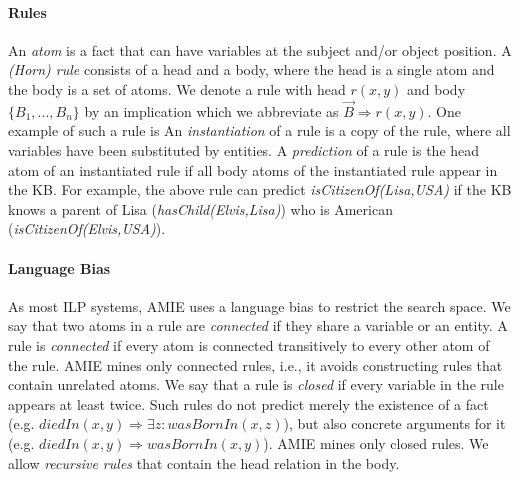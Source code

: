 \paragraph{Rules} An \emph{atom} is a fact that can have variables at the subject and/or object position. A \emph{(Horn) rule} consists of a head and a body, where the head is a single atom and the body is a set of atoms. We denote a rule with head $r(x,y)$ and body $\{B_1,..., B_n\}$ by an implication
which we abbreviate as $\vec{B} \Rightarrow r(x,y)$. One example of such a rule is
An \emph{instantiation} of a rule is a copy of the rule, where all variables have been substituted by entities. 
A \emph{prediction} of a rule is the head atom of an instantiated rule if all body atoms of the instantiated rule appear in the KB. 
For example, the above rule can predict \emph{isCitizenOf(Lisa,USA)} if the KB knows a parent of Lisa (\emph{hasChild(Elvis,Lisa)}) who is American (\emph{isCitizenOf(Elvis,USA)}).

\paragraph{Language Bias} As most ILP systems, AMIE uses a language bias to restrict the search space.
We say that two atoms in a rule are \emph{connected} if they share a variable or an entity.
A rule is \emph{connected} if every atom is connected transitively to every other atom of the rule. AMIE mines only connected rules, i.e., it avoids constructing rules that contain unrelated atoms.
We say that a rule is \emph{closed} if every variable in the rule appears at least twice. Such rules do not predict merely the existence of a fact (e.g. $diedIn(x,y)\Rightarrow \exists z:wasBornIn(x,z)$), 
but also concrete arguments for it (e.g. $diedIn(x,y)\Rightarrow wasBornIn(x,y)$). AMIE mines only closed rules. We allow \emph{recursive rules} that contain the head relation in the body.

